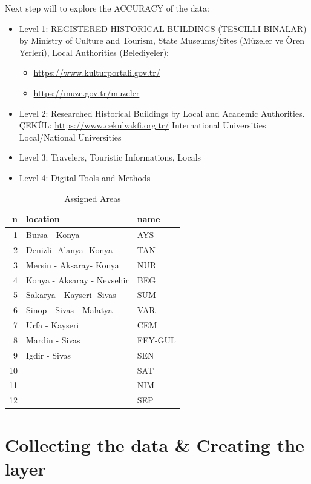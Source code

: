 \documentclass[
]{book}
\providecommand{\tightlist}{%
  \setlength{\itemsep}{0pt}\setlength{\parskip}{0pt}}
\begin{document}
Next step will to explore the ACCURACY of the data:

\begin{itemize}
\item
  Level 1: REGISTERED HISTORICAL BUILDINGS (TESCILLI BINALAR) by Ministry of Culture and Tourism, State Museums/Sites (Müzeler ve Ören Yerleri), Local Authorities (Belediyeler):

  \begin{itemize}
  \tightlist
  \item
    \url{https://www.kulturportali.gov.tr/}
  \item
    \url{https://muze.gov.tr/muzeler}
  \end{itemize}
\item
  Level 2: Researched Historical Buildings by Local and Academic Authorities.
  ÇEKÜL: \url{https://www.cekulvakfi.org.tr/}
  International Universities
  Local/National Universities
\item
  Level 3: Travelers, Touristic Informations, Locals
\item
  Level 4: Digital Tools and Methods
\end{itemize}

\begin{table}

\caption{\label{tab:unnamed-chunk-2}Assigned Areas}
\centering
\begin{tabular}[t]{r|l|l}
\hline
n & location & name\\
\hline
1 & Bursa - Konya & AYS\\
\hline
2 & Denizli- Alanya- Konya & TAN\\
\hline
3 & Mersin - Aksaray- Konya & NUR\\
\hline
4 & Konya - Aksaray - Nevsehir & BEG\\
\hline
5 & Sakarya - Kayseri- Sivas & SUM\\
\hline
6 & Sinop - Sivas - Malatya & VAR\\
\hline
7 & Urfa - Kayseri & CEM\\
\hline
8 & Mardin - Sivas & FEY-GUL\\
\hline
9 & Igdir - Sivas & SEN\\
\hline
10 &  & SAT\\
\hline
11 &  & NIM\\
\hline
12 &  & SEP\\
\hline
\end{tabular}
\end{table}

\hypertarget{collecting-the-data-creating-the-layer}{%
\section{Collecting the data \& Creating the layer}\label{collecting-the-data-creating-the-layer}}
\end{document}
